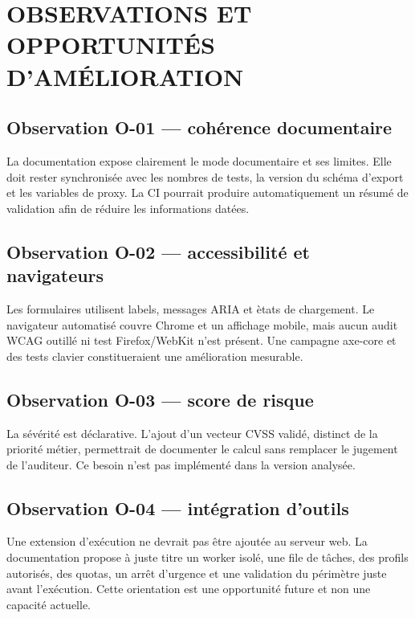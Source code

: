 \chapter{OBSERVATIONS ET OPPORTUNIT\'ES D'AM\'ELIORATION}

\section*{Observation O-01 --- coh\'erence documentaire}
La documentation expose clairement le mode documentaire et ses limites. Elle doit rester synchronis\'ee avec les nombres de tests, la version du sch\'ema d'export et les variables de proxy. La CI pourrait produire automatiquement un r\'esum\'e de validation afin de r\'eduire les informations dat\'ees.

\section*{Observation O-02 --- accessibilit\'e et navigateurs}
Les formulaires utilisent labels, messages ARIA et \`etats de chargement. Le navigateur automatis\'e couvre Chrome et un affichage mobile, mais aucun audit WCAG outill\'e ni test Firefox/WebKit n'est pr\'esent. Une campagne axe-core et des tests clavier constitueraient une am\'elioration mesurable.

\section*{Observation O-03 --- score de risque}
La s\'ev\'erit\'e est d\'eclarative. L'ajout d'un vecteur CVSS valid\'e, distinct de la priorit\'e m\'etier, permettrait de documenter le calcul sans remplacer le jugement de l'auditeur. Ce besoin n'est pas impl\'ement\'e dans la version analys\'ee.

\section*{Observation O-04 --- int\'egration d'outils}
Une extension d'ex\'ecution ne devrait pas \^etre ajout\'ee au serveur web. La documentation propose \`a juste titre un worker isol\'e, une file de t\^aches, des profils autoris\'es, des quotas, un arr\^et d'urgence et une validation du p\'erim\`etre juste avant l'ex\'ecution. Cette orientation est une opportunit\'e future et non une capacit\'e actuelle.

